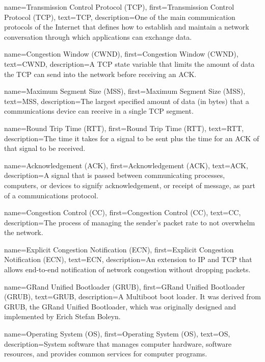 {
    name={Transmission Control Protocol (TCP)},
    first={Transmission Control Protocol (TCP)},
    text={TCP},
    description={One of the main communication protocols of the Internet that defines how to establish and maintain a network conversation through which applications can exchange data.}
}

{
    name={Congestion Window (CWND)},
    first={Congestion Window (CWND)},
    text={CWND},
    description={A TCP state variable that limits the amount of data the TCP can send into the network before receiving an ACK.}
}

{
    name={Maximum Segment Size (MSS)},
    first={Maximum Segment Size (MSS)},
    text={MSS},
    description={The largest specified amount of data (in bytes) that a communications device can receive in a single TCP segment.}
}

{
    name={Round Trip Time (RTT)},
    first={Round Trip Time (RTT)},
    text={RTT},
    description={The time it takes for a signal to be sent plus the time for an ACK of that signal to be received.}
}

{
    name={Acknowledgement (ACK)},
    first={Acknowledgement (ACK)},
    text={ACK},
    description={A signal that is passed between communicating processes, computers, or devices to signify acknowledgement, or receipt of message, as part of a communications protocol.}
}

{
    name={Congestion Control (CC)},
    first={Congestion Control (CC)},
    text={CC},
    description={The process of managing the sender's packet rate to not overwhelm the network.}
}

{
    name={Explicit Congestion Notification (ECN)},
    first={Explicit Congestion Notification (ECN)},
    text={ECN},
    description={An extension to IP and TCP that allows end-to-end notification of network congestion without dropping packets.}
}

{
    name={GRand Unified Bootloader (GRUB)},
    first={GRand Unified Bootloader (GRUB)},
    text={GRUB},
    description={A Multiboot boot loader. It was derived from GRUB, the GRand Unified Bootloader, which was originally designed and implemented by Erich Stefan Boleyn.}
}

{
    name={Operating System (OS)},
    first={Operating System (OS)},
    text={OS},
    description={System software that manages computer hardware, software resources, and provides common services for computer programs.}
}